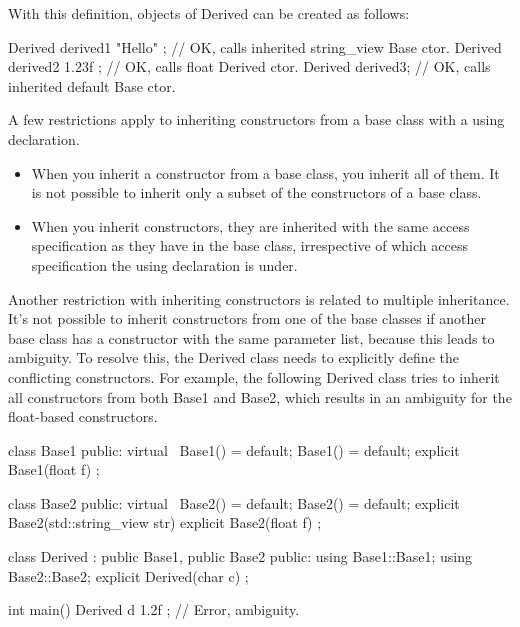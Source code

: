 With this definition, objects of Derived can be created as follows:

\begin{cpp}
Derived derived1 { "Hello" }; // OK, calls inherited string_view Base ctor.
Derived derived2 { 1.23f }; // OK, calls float Derived ctor.
Derived derived3; // OK, calls inherited default Base ctor.
\end{cpp}

A few restrictions apply to inheriting constructors from a base class with a using declaration.

\begin{itemize}
\item
When you inherit a constructor from a base class, you inherit all of them. It is not possible to inherit only a subset of the constructors of a base class.

\item
When you inherit constructors, they are inherited with the same access specification as they have in the base class, irrespective of which access specification the using declaration is under.
\end{itemize}


Another restriction with inheriting constructors is related to multiple inheritance. It’s not possible to inherit constructors from one of the base classes if another base class has a constructor with the same parameter list, because this leads to ambiguity. To resolve this, the Derived class needs to explicitly define the conflicting constructors. For example, the following Derived class tries to inherit all constructors from both Base1 and Base2, which results in an ambiguity for the float-based constructors.

\begin{cpp}
class Base1
{
    public:
        virtual ~Base1() = default;
        Base1() = default;
        explicit Base1(float f) {}
};

class Base2
{
    public:
        virtual ~Base2() = default;
        Base2() = default;
        explicit Base2(std::string_view str) {}
        explicit Base2(float f) {}
};

class Derived : public Base1, public Base2
{
    public:
        using Base1::Base1;
        using Base2::Base2;
        explicit Derived(char c) {}
};

int main()
{
    Derived d { 1.2f }; // Error, ambiguity.
}
\end{cpp}

